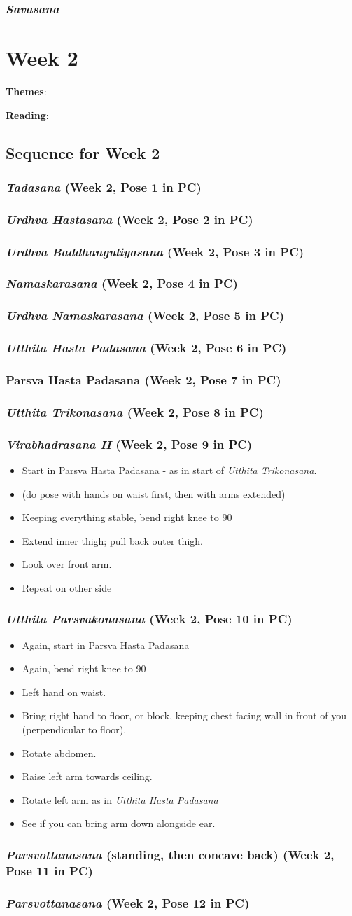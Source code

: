 \documentclass{book}
\newcommand{\apose}[1]{\emph{#1}}
\newcommand{\nam}{\apose{Namaskarasana}}
\newcommand{\parshastpad}{Parsva Hasta Padasana}
\newcommand{\parsvo}{\apose{Parsvottanasana}}
\newcommand{\sav}{\apose{Savasana}}
\newcommand{\tad}{\apose{Tadasana}}
\newcommand{\urdbad}{\apose{Urdhva Baddhanguliyasana}}
\newcommand{\urdhast}{\apose{Urdhva Hastasana}}
\newcommand{\urdnam}{\apose{Urdhva Namaskarasana}}
\newcommand{\utthastpad}{\apose{Utthita Hasta Padasana}}
\newcommand{\uttparsva}{\apose{Utthita Parsvakonasana}}
\newcommand{\utttrik}{\apose{Utthita Trikonasana}}
\newcommand{\viraii}{\apose{Virabhadrasana II}}
\newcommand{\PC}[2]{{\normalfont \hfill(Week #1, Pose #2 in PC)}}
\newcommand{\newpose}[1]{{{#1}}}
\newcounter{week}
\newcounter{pose}
\newcommand{\week}[1]
{ \IfDecimal{#1}{\setcounter{week}{\integerpart}}{fooey}
  \setcounter{pose}{1}
  \chapter{Week {#1}}}
\newcommand{\pose}{\subsection}
\begin{document}
\pose{\sav}


\week{2}
\label{week:2}

\textbf{Themes}: 

\textbf{Reading}:


\section{Sequence for Week 2}
\label{seq:2}

\pose{ \tad{} \PC{2}{1}}
\pose{ \urdhast{} \PC{2}{2}}
\pose{ \urdbad{} \PC{2}{3}}
\pose{ \nam{} \PC{2}{4}}
\pose{ \urdnam{} \PC{2}{5}}
\pose{ \utthastpad{} \PC{2}{6}}
\pose{ \parshastpad{} \PC{2}{7}}
\pose{ \utttrik{} \PC{2}{8}}
\pose{ \newpose{\viraii} \PC{2}{9}}

  \begin{itemize}
  \item Start in \parshastpad{} - as in start of \utttrik{}.
  \item (do pose with hands on waist first, then with arms extended)
  \item Keeping everything stable, bend right knee to 90\textdegree
  \item Extend inner thigh; pull back outer thigh.
  \item Look over front arm.
  \item Repeat on other side
  \end{itemize}

\pose{ \newpose{\uttparsva} \PC{2}{10}}

  \begin{itemize}
  \item Again, start in \parshastpad{}
  \item Again, bend right knee to 90\textdegree
  \item Left hand on waist.
  \item Bring right hand to floor, or block, keeping chest facing wall
    in front of you (perpendicular to floor).
  \item Rotate abdomen.
  \item Raise left arm towards ceiling.
  \item Rotate left arm as in \utthastpad{}
  \item See if you can bring arm down alongside ear.
  \end{itemize}

\pose{ \parsvo{} (standing, then concave back) \PC{2}{11}}

\pose{ \newpose{\parsvo{}} \PC{2}{12}}
\end{document}
